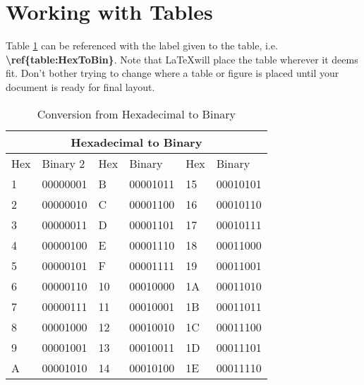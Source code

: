 \section{Working with Tables}
Table \ref{table:HexToBin} can be referenced with the label given to the table, i.e. \textbf{\textbackslash{}ref\{table:HexToBin\}}. Note that \LaTeX will place the table wherever it deems fit. Don't bother trying to change where a table or figure is placed until your document is ready for final layout.

\begin{table}
    \begin{tabular}{p{2cm}|p{2cm}|p{2cm}|p{2cm}|p{2cm}|p{2cm}}
        \hline
        \multicolumn{6}{|c|}{Hexadecimal to Binary} \\
        \hline
        Hex & Binary 2 & Hex & Binary & Hex & Binary\\
        \hline
        \hline
        1 & 00000001 & B & 00001011 & 15 & 00010101 \\
        2 & 00000010 & C & 00001100 & 16 & 00010110 \\
        3 & 00000011 & D & 00001101 & 17 & 00010111 \\
        4 & 00000100 & E & 00001110 & 18 & 00011000 \\
        5 & 00000101 & F & 00001111 & 19 & 00011001 \\
        6 & 00000110 & 10 & 00010000 & 1A & 00011010 \\
        7 & 00000111 & 11 & 00010001 & 1B & 00011011 \\
        8 & 00001000 & 12 & 00010010 & 1C & 00011100 \\
        9 & 00001001 & 13 & 00010011 & 1D & 00011101 \\
        A & 00001010 & 14 & 00010100 & 1E & 00011110 \\
        \hline
    \end{tabular}
    \caption{Conversion from Hexadecimal to Binary}
    \label{table:HexToBin}
\end{table}